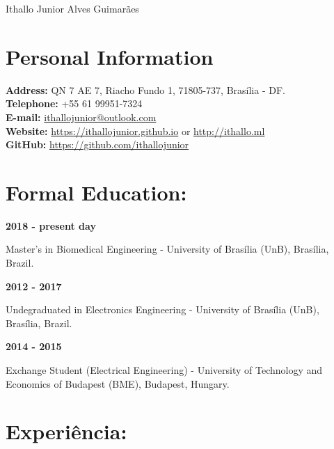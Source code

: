 \documentclass[11pt]{article}
\begin{document}
\begin{center}
\huge{Ithallo Junior Alves Guimarães}
\end{center}

\section{Personal Information}

\begin{addmargin}{0.5cm}

\textbf{Address:}  QN 7 AE 7, Riacho Fundo 1, 71805-737, Brasília - DF. \\
\textbf{Telephone:}  +55 61 99951-7324 \\
\textbf{E-mail:}   \href{maito:ithallojunior@outlook.com}{ithallojunior@outlook.com} \\
\textbf{Website:}  \url{https://ithallojunior.github.io} or \url{http://ithallo.ml} \\
\textbf{GitHub:} \url{https://github.com/ithallojunior}

\end{addmargin}


\section{Formal Education:}

\textbf{2018 - present day}
\begin{addmargin}{0.5cm}
Master's in Biomedical Engineering - University of Brasília (UnB), Brasília, Brazil. \\
\end{addmargin}

\textbf{2012 - 2017}
\begin{addmargin}{0.5cm}
Undegraduated in Electronics Engineering - University of Brasília (UnB), Brasília, Brazil. \\
\end{addmargin}

\textbf{2014 - 2015} 
\begin{addmargin}{0.5cm}
Exchange Student (Electrical Engineering) - University of Technology and Economics of Budapest (BME), Budapest, Hungary. 
\end{addmargin}

\section{Experiência:}
\end{document}
